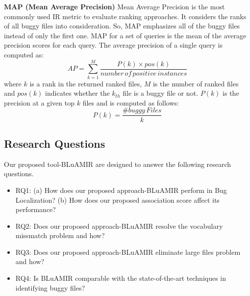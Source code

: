 \documentclass[conference]{IEEEtran}
\begin{document}
\textbf{MAP (Mean Average Precision)}
Mean Average Precision is the most commonly used IR metric to evaluate ranking approaches. It considers the ranks of all buggy files into consideration. So, MAP emphasizes all of the buggy files instead of only the first one.
MAP for a set of queries is the mean of the average precision scores for each query. The average precision of a single query is computed as:
\begin{equation}
AP=\sum_{k=1}^{M}\frac{P(k)\times pos(k)}{number \, of \, positive \, instances}
\end{equation}
where $k$ is a rank in the returned ranked files, $M$ is the number of ranked files and $pos(k)$ indicates whether the $k_{th}$ file is a buggy file or not. $P(k)$ is the precision at a given top $k$ files and is computed as follows:
\begin{equation}
P(k)=\frac{\#buggy \, Files}{k}
\end{equation}

%


\subsection{Research Questions}
Our proposed tool-BLuAMIR are designed to  answer the following research questions.
\begin{itemize}
	\item RQ1: (a) How does our proposed approach-BLuAMIR perform in Bug Localization? (b) How does our proposed association score affect its performance?
	\item RQ2: Does our proposed approach-BLuAMIR resolve the vocabulary missmatch problem and how?
	\item RQ3: Does our proposed approach-BLuAMIR eliminate large files problem and how?
	\item RQ4: Is BLuAMIR comparable with the state-of-the-art techniques in identifying buggy files?
\end{itemize}
\end{document}
